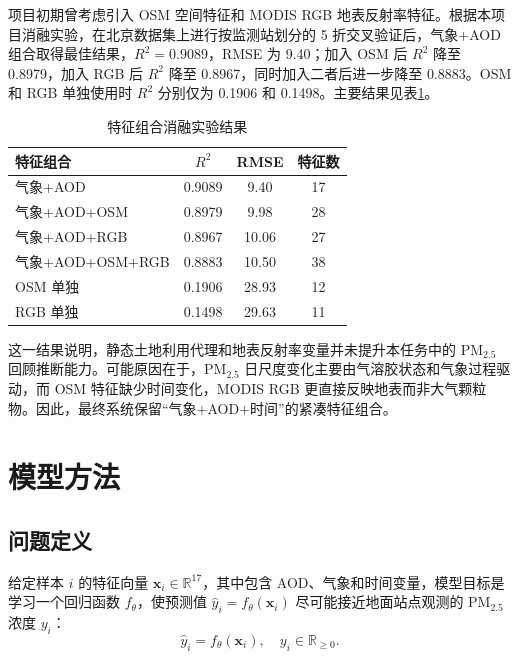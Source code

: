 ﻿\documentclass[UTF8,zihao=-4,a4paper]{ctexart}
\newcommand{\pmfine}{PM$_{2.5}$}
\newcommand{\aod}{AOD}
\begin{document}
项目初期曾考虑引入 OSM 空间特征和 MODIS RGB 地表反射率特征。根据本项目消融实验，在北京数据集上进行按监测站划分的 5 折交叉验证后，气象+\aod{} 组合取得最佳结果，$R^2=0.9089$，RMSE 为 9.40；加入 OSM 后 $R^2$ 降至 0.8979，加入 RGB 后 $R^2$ 降至 0.8967，同时加入二者后进一步降至 0.8883。OSM 和 RGB 单独使用时 $R^2$ 分别仅为 0.1906 和 0.1498。主要结果见表\ref{tab:ablation}。

\begin{table}[H]
  \centering
  \caption{特征组合消融实验结果}
  \label{tab:ablation}
  \begin{tabular}{lccc}
    \toprule
    特征组合 & $R^2$ & RMSE & 特征数 \\
    \midrule
    气象+\aod{} & 0.9089 & 9.40 & 17 \\
    气象+\aod{}+OSM & 0.8979 & 9.98 & 28 \\
    气象+\aod{}+RGB & 0.8967 & 10.06 & 27 \\
    气象+\aod{}+OSM+RGB & 0.8883 & 10.50 & 38 \\
    OSM 单独 & 0.1906 & 28.93 & 12 \\
    RGB 单独 & 0.1498 & 29.63 & 11 \\
    \bottomrule
  \end{tabular}
\end{table}

这一结果说明，静态土地利用代理和地表反射率变量并未提升本任务中的 \pmfine{} 回顾推断能力。可能原因在于，\pmfine{} 日尺度变化主要由气溶胶状态和气象过程驱动，而 OSM 特征缺少时间变化，MODIS RGB 更直接反映地表而非大气颗粒物。因此，最终系统保留“气象+\aod{}+时间”的紧凑特征组合。

\section{模型方法}

\subsection{问题定义}

给定样本 $i$ 的特征向量 $\mathbf{x}_i \in \mathbb{R}^{17}$，其中包含 \aod{}、气象和时间变量，模型目标是学习一个回归函数 $f_{\theta}$，使预测值 $\hat{y}_i=f_{\theta}(\mathbf{x}_i)$ 尽可能接近地面站点观测的 \pmfine{} 浓度 $y_i$：
\begin{equation}
  \hat{y}_i = f_{\theta}(\mathbf{x}_i), \quad
  y_i \in \mathbb{R}_{\geq 0}.
  \label{eq:regression}
\end{equation}
\end{document}

